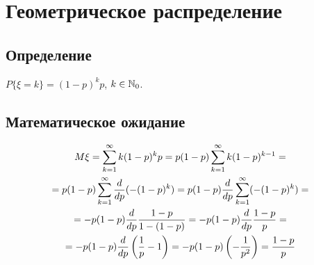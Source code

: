\section{Геометрическое распределение}
\subsection{Определение}
$P\{\xi=k\} = (1-p)^{k} p$, $k\in\mathbb{N}_0$.
\subsection{Математическое ожидание}
\begin{multline}\label{matozhidanie_geom}
M\xi =
\sum\limits_{k=1}^\infty k (1-p)^{k} p =
p(1-p)\sum\limits_{k=1}^\infty k (1-p)^{k-1} =
\\=
p(1-p)\sum\limits_{k=1}^\infty \frac{d}{dp}(-(1-p)^{k}) =
p(1-p)\frac{d}{dp} \sum\limits_{k=1}^\infty (-(1-p)^{k}) =
\\=
-p(1-p)\frac{d}{dp} \frac{1-p}{1-(1-p)} = 
-p(1-p)\frac{d}{dp} \frac{1-p}{p} =
\\=
-p(1-p)\frac{d}{dp} \left(\frac{1}{p}-1\right) = 
-p(1-p)\left(-\frac{1}{p^2}\right) =
\frac{1-p}{p}
\end{multline}

